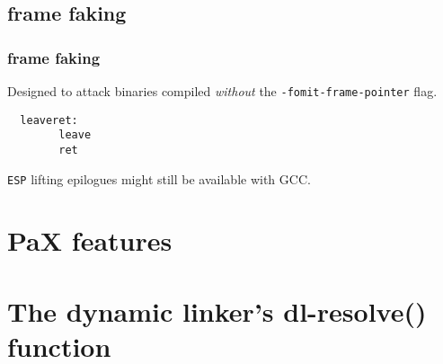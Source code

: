 \documentclass[10pt]{beamer}
\begin{document}
\begin{frame}
\begin{columns}[c]
  \end{columns}
\end{frame}

\subsection{frame faking}

\begin{frame}[fragile]
  \frametitle{frame faking}
  Designed to attack binaries compiled \emph{without} the
  \texttt{-fomit-frame-pointer} flag.

  \begin{lstlisting}
  leaveret:
        leave
        ret
  \end{lstlisting}

  \texttt{ESP} lifting epilogues might still be available with GCC.

\end{frame}



\section{PaX features}  %





\section{The dynamic linker's dl-resolve() function}  %
\end{document}
